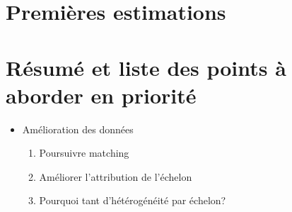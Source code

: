 \documentclass[11pt,a4paper]{article}
\begin{document}
\begin{figure}[ht]
\begin{subfigure}[b]{0.75\linewidth}
    \vspace{4ex}
  \end{subfigure} 
\end{figure}


\section{Premières estimations}


\section{Résumé et liste des points à aborder en priorité}


\begin{itemize}
\item Amélioration des données 
\begin{enumerate}
\item Poursuivre matching
\item Améliorer l'attribution de l'échelon
\item Pourquoi tant d'hétérogénéité par échelon? 
\end{enumerate}
\end{itemize}
\end{document}
